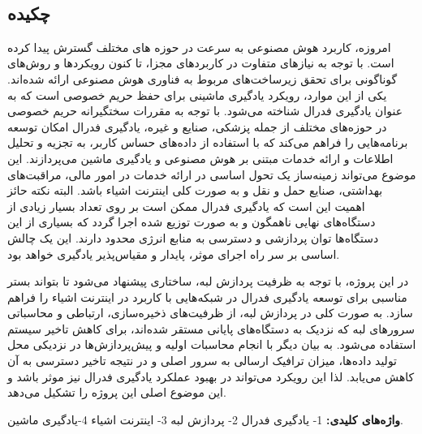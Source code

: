 
\setcounter{page}{1}
\thispagestyle{empty}

~\vfill

\subsection*{چکیده}
\begin{small}
\baselineskip=0.7cm
امروزه، کاربرد هوش مصنوعی به سرعت در حوزه های مختلف گسترش پیدا کرده است. با توجه به نیازهای متفاوت در کاربردهای مجزا، تا کنون رویکردها و روش‌های گوناگونی برای تحقق زیرساخت‌های مربوط به فناوری هوش مصنوعی ارائه شده‌اند. یکی از این موارد، رویکرد یادگیری ماشینی برای حفظ حریم خصوصی است که به عنوان یادگیری فدرال شناخته می‌شود. با توجه به مقررات سختگیرانه حریم خصوصی در حوزه‌های مختلف از جمله پزشکی، صنایع و غیره، یادگیری فدرال امکان توسعه برنامه‌هایی را فراهم می‌کند که با استفاده از داده‌های حساس کاربر، به تجزیه و تحلیل اطلاعات و ارائه خدمات مبتنی بر هوش مصنوعی و یادگیری ماشین می‌پردازند. این موضوع می‌تواند زمینه‌ساز یک تحول اساسی در ارائه خدمات در امور مالی، مراقبت‌های بهداشتی، صنایع حمل و نقل و به صورت کلی اینترنت اشیاء باشد. البته نکته حائز اهمیت این است که یادگیری فدرال ممکن است بر روی تعداد بسیار زیادی از دستگاه‌های نهایی ناهمگون و به صورت توزیع شده اجرا گردد که بسیاری از این دستگاه‌ها توان پردازشی و دسترسی به منابع انرژی محدود دارند. این یک چالش اساسی بر سر راه اجرای موثر، پایدار و مقیاس‌پذیر یادگیری خواهد بود.


در این پروژه، با توجه به ظرفیت پردازش لبه، ساختاری پیشنهاد می‌شود تا بتواند بستر مناسبی برای توسعه یادگیری فدرال در شبکه‌هایی با کاربرد در اینترنت اشیاء را فراهم سازد. به صورت کلی در پردازش لبه، از ظرفیت‌های ذخیره‌سازی، ارتباطی و محاسباتی سرورهای لبه که نزدیک به دستگاه‌های پایانی مستقر شده‌اند، برای کاهش تاخیر سیستم استفاده می‌شود. به بیان دیگر با انجام محاسبات اولیه و پیش‌پردازش‌ها در نزدیکی محل تولید داده‌ها، میزان ترافیک ارسالی به سرور اصلی و در نتیجه تاخیر دسترسی به آن کاهش می‌یابد. لذا این رویکرد می‌تواند در بهبود عملکرد یادگیری فدرال نیز موثر باشد و این موضوع اصلی این پروژه را تشکیل می‌دهد.

\vspace*{0.5 cm}

\noindent\textbf{واژه‌های کلیدی:}
1- یادگیری فدرال 2- پردازش لبه 3- اینترنت اشیاء 4-يادگيری ماشين.
\end{small}